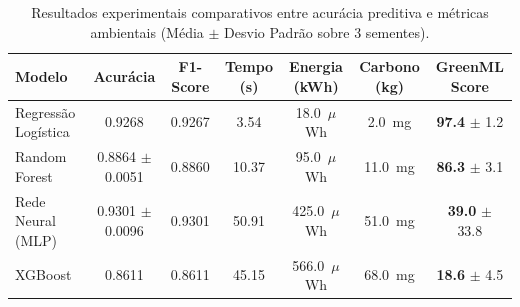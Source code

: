 \begin{table}[htbp]
\centering
\small
\caption{Resultados experimentais comparativos entre acurácia preditiva e métricas ambientais (Média $\pm$ Desvio Padrão sobre 3 sementes).}
\label{tab:resultados_greenml}
\begin{tabular}{lcccccc}
\toprule
\textbf{Modelo} & \textbf{Acurácia} & \textbf{F1-Score} & \textbf{Tempo (s)} & \textbf{Energia (kWh)} & \textbf{Carbono (kg)} & \textbf{GreenML Score} \\
\midrule
Regressão Logística & 0.9268 & 0.9267 & 3.54 & 18.0~$\mu$Wh & 2.0~mg & \textbf{97.4} $\pm$ 1.2 \\
Random Forest & 0.8864 $\pm$ 0.0051 & 0.8860 & 10.37 & 95.0~$\mu$Wh & 11.0~mg & \textbf{86.3} $\pm$ 3.1 \\
Rede Neural (MLP) & 0.9301 $\pm$ 0.0096 & 0.9301 & 50.91 & 425.0~$\mu$Wh & 51.0~mg & \textbf{39.0} $\pm$ 33.8 \\
XGBoost & 0.8611 & 0.8611 & 45.15 & 566.0~$\mu$Wh & 68.0~mg & \textbf{18.6} $\pm$ 4.5 \\
\bottomrule
\end{tabular}
\end{table}
